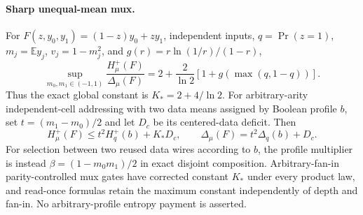 \paragraph{Sharp unequal-mean mux.}
For $F(z,y_0,y_1)=(1-z)y_0+zy_1$, independent inputs, $q=\Pr(z=1)$,
$m_j=\mathbb E y_j$, $v_j=1-m_j^2$, and $g(r)=r\ln(1/r)/(1-r)$,
\[
 \sup_{m_0,m_1\in(-1,1)}\frac{H_\mu^+(F)}{\Delta_\mu(F)}
 =2+\frac{2}{\ln2}\left[1+g(\max(q,1-q))\right].
\]
Thus the exact global constant is $K_*=2+4/\ln2$.
For arbitrary-arity independent-cell addressing with two data means assigned
by Boolean profile $b$, set $t=(m_1-m_0)/2$ and let $D_c$ be its centered-data deficit.
Then
\[
 H_\mu^+(F)\le t^2H_q^+(b)+K_*D_c,\qquad
 \Delta_\mu(F)=t^2\Delta_q(b)+D_c.
\]
For selection between two reused data wires according to $b$, the profile
multiplier is instead $\beta=(1-m_0m_1)/2$ in exact disjoint composition.
Arbitrary-fan-in parity-controlled mux gates have corrected constant $K_*$
under every product law, and read-once formulas retain the maximum constant
independently of depth and fan-in. No arbitrary-profile entropy payment is asserted.
